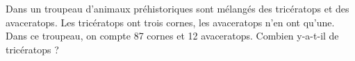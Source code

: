 Dans un troupeau d'animaux préhistoriques sont mélangés des
tricératops et des avaceratops. Les tricératops ont trois cornes, les
avaceratops n'en ont qu'une. Dans ce troupeau, on compte 87 cornes et
12 avaceratops. Combien y-a-t-il de tricératops ?